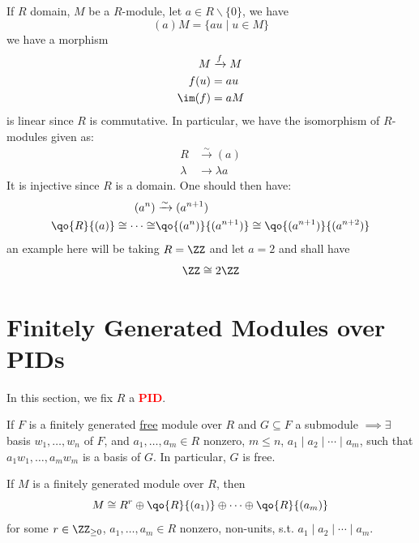 \begin{remark}
	If \( R \) domain, \( M \) be a \( R \)-module, let \( a \in R \backslash \{0\} \), we have
	\[
		(a) M = \{au \; | \; u \in M\}
	\]
	we have a morphism
	\[
		\begin{aligned}
			M      & \xrightarrow{f} M \\
			f(u)   & = au              \\
			\im(f) & = aM
		\end{aligned}
	\]
	is linear since \( R \) is commutative. In particular, we have the isomorphism of \( R \)-modules
	given as:
	\[
		\begin{aligned}
			R       & \xrightarrow{\sim} (a) \\
			\lambda & \to \lambda a
		\end{aligned}
	\]
	It is injective since \( R \) is a domain. One should then have:
	\[
		\begin{aligned}
			(a^n)                          & \xrightarrow{\sim} (a^{n+1})                          \\
			\qo{R}{(a)} \cong \cdots \cong & \qo{(a^n)}{(a^{n+1})} \cong \qo{(a^{n+1})}{(a^{n+2})}
		\end{aligned}
	\]
	an example here will be taking \( R = \ZZ \) and let \( a = 2 \) and shall have
	\[
		\ZZ \cong 2\ZZ
	\]
\end{remark}

\section{Finitely Generated Modules over PIDs}
In this section, we fix \( R \) a \textbf{\textcolor{red}{PID}}.

\begin{theorem}
	\label{thm:pid-module-1}
	If \( F \) is a finitely generated \underline{free} module over \( R \) and \( G \subseteq F \) a
	submodule \( \implies \exists \) basis \( w_1,\ldots, w_n \) of \( F \), and \( a_1,\ldots,a_m \in
	R\) nonzero, \( m\leq n \), \( a_1 \mid a_2 \mid \cdots \mid a_m \), such that \( a_1w_1,\ldots,
	a_m w_m \) is a basis of \( G \). In particular, \( G \) is free.
\end{theorem}

\begin{theorem}
	\label{thm:pid-module-2}
	If \( M \) is a finitely generated module over \( R \), then
	\[
		M \cong R^r \oplus \qo{R}{(a_1)} \oplus \cdots \oplus \qo{R}{(a_m)}
	\]
	for some \( r \in \ZZ_{\geq 0} \), \( a_1,\ldots, a_m \in R \) nonzero, non-units, s.t. \( a_1\mid
	a_2 \mid \cdots \mid a_m\).
\end{theorem}

